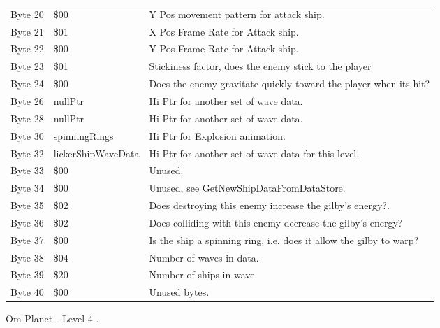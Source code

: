 \begin{figure}[H]
{\begin{adjustbox}{width=12cm}
\begin{tabular}{lll}
 Byte 20 & \$00                       & Y Pos movement pattern for attack ship.                            \\
 Byte 21 & \$01                       & X Pos Frame Rate for Attack ship.                                  \\
 Byte 22 & \$00                       & Y Pos Frame Rate for Attack ship.                                  \\
 Byte 23 & \$01                       & Stickiness factor, does the enemy stick to the player              \\
 Byte 24 & \$00                       & Does the enemy gravitate quickly toward the player when its hit?   \\
 Byte 26 & nullPtr                   & Hi Ptr for another set of wave data.                               \\
 Byte 28 & nullPtr                   & Hi Ptr for another set of wave data.                               \\
 Byte 30 & spinningRings             & Hi Ptr for Explosion animation.                                    \\
 Byte 32 & lickerShipWaveData        & Hi Ptr for another set of wave data for this level.                \\
 Byte 33 & \$00                       & Unused.                                                            \\
 Byte 34 & \$00                       & Unused, see GetNewShipDataFromDataStore.                           \\
 Byte 35 & \$02                       & Does destroying this enemy increase the gilby's energy?.           \\
 Byte 36 & \$02                       & Does colliding with this enemy decrease the gilby's energy?        \\
 Byte 37 & \$00                       & Is the ship a spinning ring, i.e. does it allow the gilby to warp? \\
 Byte 38 & \$04                       & Number of waves in data.                                           \\
 Byte 39 & \$20                       & Number of ships in wave.                                           \\
 Byte 40 & \$00                       & Unused bytes.                                                      \\
\bottomrule
\end{tabular}

  \end{adjustbox}

  }\caption*{Om Planet - Level 4
.}
\end{figure}

